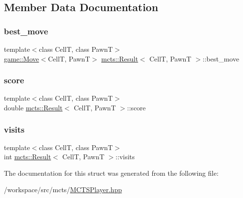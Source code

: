 \subsection{Member Data Documentation}
\mbox{\label{structmcts_1_1_result_a7b379d95aea9fdae5700fc2b5e69b775}} 
\subsubsection{\texorpdfstring{best\+\_\+move}{best\_move}}
{\footnotesize\ttfamily template$<$class CellT, class PawnT$>$ \\
\hyperlink{structgame_1_1_move}{game\+::\+Move}$<$CellT, PawnT$>$ \hyperlink{structmcts_1_1_result}{mcts\+::\+Result}$<$ CellT, PawnT $>$\+::best\+\_\+move}

\mbox{\label{structmcts_1_1_result_a03397dc4dfc826e29935aa4ee6d51059}} 
\subsubsection{\texorpdfstring{score}{score}}
{\footnotesize\ttfamily template$<$class CellT, class PawnT$>$ \\
double \hyperlink{structmcts_1_1_result}{mcts\+::\+Result}$<$ CellT, PawnT $>$\+::score}

\mbox{\label{structmcts_1_1_result_a3a540aa4397f0877f98d84760e89f8d2}} 
\subsubsection{\texorpdfstring{visits}{visits}}
{\footnotesize\ttfamily template$<$class CellT, class PawnT$>$ \\
int \hyperlink{structmcts_1_1_result}{mcts\+::\+Result}$<$ CellT, PawnT $>$\+::visits}



The documentation for this struct was generated from the following file\+:\begin{DoxyCompactItemize}
\item 
/workspace/src/mcts/\hyperlink{_m_c_t_s_player_8hpp}{M\+C\+T\+S\+Player.\+hpp}\end{DoxyCompactItemize}
